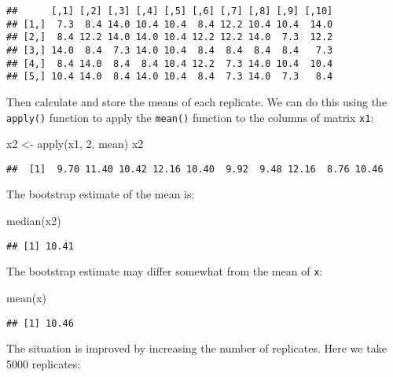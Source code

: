 \documentclass[
  12pt,
  a4paper]{book}
\newenvironment{Shaded}{\begin{snugshade}}{\end{snugshade}}
\newcommand{\DecValTok}[1]{\textcolor[rgb]{0.00,0.00,0.81}{#1}}
\newcommand{\FunctionTok}[1]{\textcolor[rgb]{0.00,0.00,0.00}{#1}}
\newcommand{\NormalTok}[1]{#1}
\newcommand{\OtherTok}[1]{\textcolor[rgb]{0.56,0.35,0.01}{#1}}
\begin{document}
\begin{verbatim}
##      [,1] [,2] [,3] [,4] [,5] [,6] [,7] [,8] [,9] [,10]
## [1,]  7.3  8.4 14.0 10.4 10.4  8.4 12.2 10.4 10.4  14.0
## [2,]  8.4 12.2 14.0 14.0 10.4 12.2 12.2 14.0  7.3  12.2
## [3,] 14.0  8.4  7.3 14.0 10.4  8.4  8.4  8.4  8.4   7.3
## [4,]  8.4 14.0  8.4  8.4 10.4 12.2  7.3 14.0 10.4  10.4
## [5,] 10.4 14.0  8.4 14.0 10.4  8.4  7.3 14.0  7.3   8.4
\end{verbatim}

Then calculate and store the means of each replicate. We can do this using the \texttt{apply()} function to apply the \texttt{mean()} function to the columns of matrix \texttt{x1}:

\begin{Shaded}
\begin{Highlighting}[]
\NormalTok{x2 }\OtherTok{\textless{}{-}} \FunctionTok{apply}\NormalTok{(x1, }\DecValTok{2}\NormalTok{, mean)}
\NormalTok{x2}
\end{Highlighting}
\end{Shaded}

\begin{verbatim}
##  [1]  9.70 11.40 10.42 12.16 10.40  9.92  9.48 12.16  8.76 10.46
\end{verbatim}

The bootstrap estimate of the mean is:

\begin{Shaded}
\begin{Highlighting}[]
\FunctionTok{median}\NormalTok{(x2)}
\end{Highlighting}
\end{Shaded}

\begin{verbatim}
## [1] 10.41
\end{verbatim}

The bootstrap estimate may differ somewhat from the mean of \texttt{x}:

\begin{Shaded}
\begin{Highlighting}[]
\FunctionTok{mean}\NormalTok{(x)}
\end{Highlighting}
\end{Shaded}

\begin{verbatim}
## [1] 10.46
\end{verbatim}

The situation is improved by increasing the number of replicates. Here we take 5000 replicates:
\end{document}
